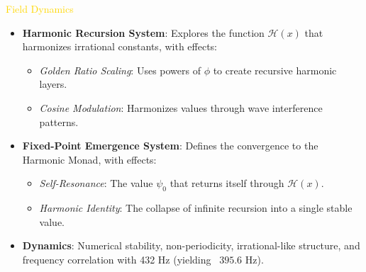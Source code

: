 \textcolor{gold}{ Field Dynamics } \\
\begin{itemize}
    \item \textbf{Harmonic Recursion System}: Explores the function $\mathcal{H}(x)$ that harmonizes irrational constants, with effects:
    \begin{itemize}\setlength{\itemsep}{0.2cm}
        \item \textit{Golden Ratio Scaling}: Uses powers of $\phi$ to create recursive harmonic layers.
        \item \textit{Cosine Modulation}: Harmonizes values through wave interference patterns.
    \end{itemize}
    \item \textbf{Fixed-Point Emergence System}: Defines the convergence to the Harmonic Monad, with effects:
    \begin{itemize}\setlength{\itemsep}{0.2cm}
        \item \textit{Self-Resonance}: The value $\psi_0$ that returns itself through $\mathcal{H}(x)$.
        \item \textit{Harmonic Identity}: The collapse of infinite recursion into a single stable value.
    \end{itemize}
    \item \textbf{Dynamics}: Numerical stability, non-periodicity, irrational-like structure, and frequency correlation with 432 Hz (yielding ~$395.6 \text{ Hz}$).
\end{itemize}

